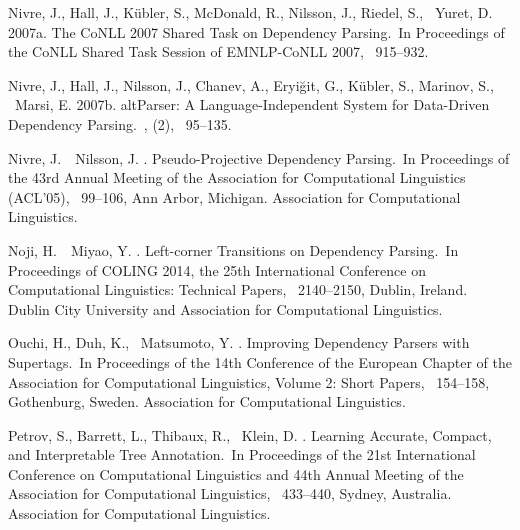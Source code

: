 \documentclass[english]{jnlp_1.4}
\begin{document}
\begin{thebibliography}{}
Nivre, J., Hall, J., K\"ubler, S., McDonald, R., Nilsson, J., Riedel, S., \BBA\
  Yuret, D. \BBOP 2007a\BBCP.
\newblock \BBOQ The {CoNLL} 2007 Shared Task on Dependency Parsing.\BBCQ\
\newblock In {\Bem Proceedings of the CoNLL Shared Task Session of EMNLP-CoNLL
  2007}, \mbox{\BPGS\ 915--932}.

Nivre, J., Hall, J., Nilsson, J., Chanev, A., Eryi{\u{g}}it, G., K{\"u}bler,
  S., Marinov, S., \BBA\ Marsi, E. \BBOP 2007b\BBCP.
\newblock \BBOQ {M}alt{P}arser: A Language-Independent System for Data-Driven
  Dependency Parsing.\BBCQ\
\newblock {\Bem Natural Language Engineering}, {}  (2), \mbox{\BPGS\
  95--135}.

Nivre, J.\BBACOMMA\ \BBA\ Nilsson, J. \BBCP.
\newblock \BBOQ Pseudo-Projective Dependency Parsing.\BBCQ\
\newblock In {\Bem Proceedings of the 43rd Annual Meeting of the Association
  for Computational Linguistics (ACL'05)}, \mbox{\BPGS\ 99--106}, Ann Arbor,
  Michigan. Association for Computational Linguistics.

Noji, H.\BBACOMMA\ \BBA\ Miyao, Y. \BBOP 2014\BBCP.
\newblock \BBOQ Left-corner Transitions on Dependency Parsing.\BBCQ\
\newblock In {\Bem Proceedings of COLING 2014, the 25th International
  Conference on Computational Linguistics: Technical Papers}, \mbox{\BPGS\
  2140--2150}, Dublin, Ireland. Dublin City University and Association for
  Computational Linguistics.

Ouchi, H., Duh, K., \BBA\ Matsumoto, Y. \BBCP.
\newblock \BBOQ Improving Dependency Parsers with Supertags.\BBCQ\
\newblock In {\Bem Proceedings of the 14th Conference of the European Chapter
  of the Association for Computational Linguistics, Volume 2: Short Papers},
  \mbox{\BPGS\ 154--158}, Gothenburg, Sweden. Association for Computational
  Linguistics.

Petrov, S., Barrett, L., Thibaux, R., \BBA\ Klein, D. \BBCP.
\newblock \BBOQ Learning Accurate, Compact, and Interpretable Tree
  Annotation.\BBCQ\
\newblock In {\Bem Proceedings of the 21st International Conference on
  Computational Linguistics and 44th Annual Meeting of the Association for
  Computational Linguistics}, \mbox{\BPGS\ 433--440}, Sydney, Australia.
  Association for Computational Linguistics.


\end{thebibliography}
\end{document}
